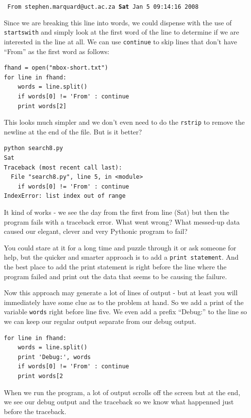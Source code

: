 \documentclass[10pt]{book}
\begin{document}
{\tt
From stephen.marquard@uct.ac.za {\bf Sat} Jan  5 09:14:16 2008
}

Since we are breaking this line into words, we could dispense
with the use of {\tt startswith} and simply look at the 
first word of the line to determine if we are interested
in the line at all.  We can use {\tt continue} to skip lines
that don't have ``From'' as the first word as follows:

\beforeverb
\begin{verbatim}
fhand = open("mbox-short.txt")
for line in fhand:
    words = line.split()
    if words[0] != 'From' : continue
    print words[2]
\end{verbatim}
\afterverb
%
This looks much simpler and we don't even need to do the 
{\tt rstrip} to remove the newline at the end of the file.
But is it better?

\beforeverb
\begin{verbatim}
python search8.py 
Sat
Traceback (most recent call last):
  File "search8.py", line 5, in <module>
    if words[0] != 'From' : continue
IndexError: list index out of range
\end{verbatim}
\afterverb
%
It kind of works - we see the day from the first from line
(Sat) but then the program fails with a traceback error.
What went wrong?  What messed-up data caused our elegant, 
clever and very Pythonic program to fail?

You could stare at it for a long time and puzzle through
it or ask someone for help, but the quicker and smarter
approach is to add a {\tt print statement}.  And the best place
to add the print statement is right before the line where
the program failed and print out the data that seems to be causing
the failure.

Now this approach may generate a lot of lines of output - but at 
least you will immediately have some clue as to the 
problem at hand.  So we add a print of the variable
{\tt words} right before line five.  We even 
add a prefix ``Debug:'' to the line so we can keep
our regular output separate from our debug output.

\beforeverb
\begin{verbatim}
for line in fhand:
    words = line.split()
    print 'Debug:', words
    if words[0] != 'From' : continue
    print words[2
\end{verbatim}
\afterverb
%
When we run the program, a lot of output scrolls off the screen
but at the end, we see our debug output and the traceback so 
we know what happenned just before the traceback.
\end{document}
